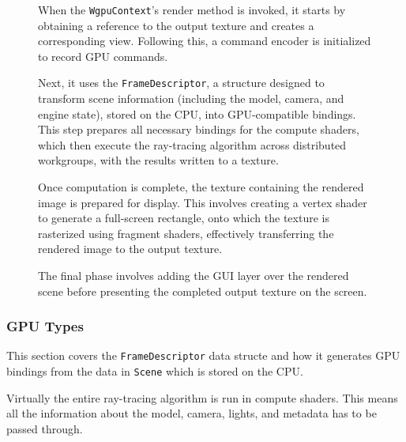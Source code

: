 \begin{figure}[H]
\noindent\begin{minipage}[t]{0.65\textwidth}
  \vspace{0.5cm}
  When the \verb|WgpuContext|'s render method is invoked, it starts by obtaining a reference to the output texture and creates a corresponding view. Following this, a command encoder is initialized to record GPU commands.

  Next, it uses the \verb|FrameDescriptor|, a structure designed to transform scene information (including the model, camera, and engine state), stored on the CPU, into GPU-compatible bindings. This step prepares all necessary bindings for the compute shaders, which then execute the ray-tracing algorithm across distributed workgroups, with the results written to a texture.

  Once computation is complete, the texture containing the rendered image is prepared for display. This involves creating a vertex shader to generate a full-screen rectangle, onto which the texture is rasterized using fragment shaders, effectively transferring the rendered image to the output texture.

  The final phase involves adding the GUI layer over the rendered scene before presenting the completed output texture on the screen.

\end{minipage}
\hfill
\begin{minipage}[t]{0.3\textwidth}
  \vspace{-0.5cm}
  \begin{figure}[H]
    \centering
    
  \end{figure}
\end{minipage}
\end{figure}

\subsubsection{GPU Types}
This section covers the \verb|FrameDescriptor| data structe and how it generates GPU bindings from the data in \verb|Scene| which is stored on the CPU.

Virtually the entire ray-tracing algorithm is run in compute shaders. This means all the information about the model, camera, lights, and metadata has to be passed through.

